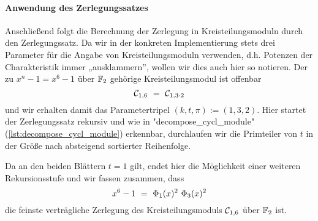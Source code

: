 \paragraph{Anwendung des Zerlegungssatzes} Anschließend folgt die Berechnung
der Zerlegung in Kreisteilungsmoduln durch den Zerlegungssatz. Da wir in der
konkreten Implementierung stets drei Parameter für die Angabe von
Kreisteilungsmoduln verwenden, d.h. Potenzen der Charakteristik immer
„ausklammern”, wollen wir dies auch hier so notieren. Der zu
$x^n-1 = x^6-1$ über $\mathbb{F}_2$ gehörige Kreisteilungsmodul ist offenbar
\[ \mathcal{C}_{1,6} \ =\  \mathcal{C}_{1,3\cdot 2}\]
und wir erhalten damit das Parametertripel $(k,t,\pi) := (1,3,2)$.
Hier startet der Zerlegungssatz rekursiv und wie in "decompose_cycl_module" 
(\autoref{lst:decompose_cycl_module}) erkennbar, durchlaufen wir die Primteiler
von $t$ in der Größe nach absteigend sortierter Reihenfolge.

\begin{center}
\end{center}
Da an den beiden Blättern $t=1$ gilt, endet hier die Möglichkeit einer weiteren
Rekursionsstufe und wir fassen zusammen, dass
\[ x^6-1 \ =\  \Phi_1(x)^2 \ \Phi_3(x)^2 \]
die feinste verträgliche Zerlegung des Kreisteilungsmoduls $\mathcal{C}_{1,6}$
über $\mathbb{F}_2$ ist.


